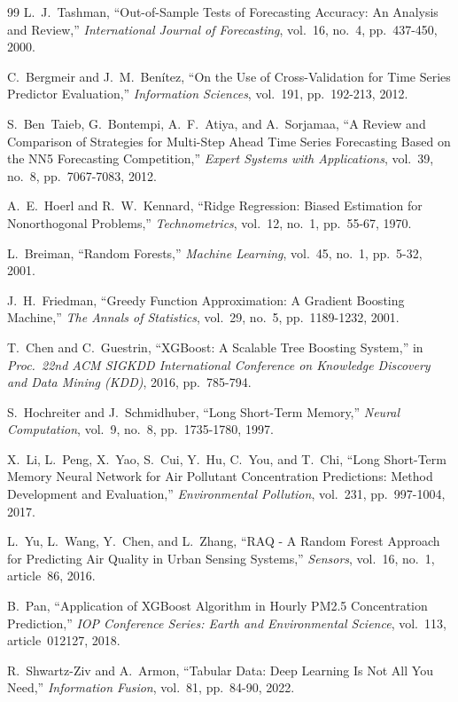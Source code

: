\begin{thebibliography}{99}
 L.~J.~Tashman, ``Out-of-Sample Tests of Forecasting
Accuracy: An Analysis and Review,'' \emph{International Journal of Forecasting},
vol.~16, no.~4, pp.~437-450, 2000.

 C.~Bergmeir and J.~M.~Benítez, ``On the Use of
Cross-Validation for Time Series Predictor Evaluation,'' \emph{Information
Sciences}, vol.~191, pp.~192-213, 2012.

 S.~Ben~Taieb, G.~Bontempi, A.~F.~Atiya, and A.~Sorjamaa,
``A Review and Comparison of Strategies for Multi-Step Ahead Time Series
Forecasting Based on the NN5 Forecasting Competition,'' \emph{Expert Systems with
Applications}, vol.~39, no.~8, pp.~7067-7083, 2012.

 A.~E.~Hoerl and R.~W.~Kennard, ``Ridge Regression: Biased
Estimation for Nonorthogonal Problems,'' \emph{Technometrics}, vol.~12, no.~1,
pp.~55-67, 1970.

 L.~Breiman, ``Random Forests,'' \emph{Machine Learning},
vol.~45, no.~1, pp.~5-32, 2001.

 J.~H.~Friedman, ``Greedy Function Approximation: A Gradient
Boosting Machine,'' \emph{The Annals of Statistics}, vol.~29, no.~5,
pp.~1189-1232, 2001.

 T.~Chen and C.~Guestrin, ``XGBoost: A Scalable Tree
Boosting System,'' in \emph{Proc.\ 22nd ACM SIGKDD International Conference on
Knowledge Discovery and Data Mining (KDD)}, 2016, pp.~785-794.

 S.~Hochreiter and J.~Schmidhuber, ``Long Short-Term Memory,''
\emph{Neural Computation}, vol.~9, no.~8, pp.~1735-1780, 1997.

 X.~Li, L.~Peng, X.~Yao, S.~Cui, Y.~Hu, C.~You, and T.~Chi,
``Long Short-Term Memory Neural Network for Air Pollutant Concentration
Predictions: Method Development and Evaluation,'' \emph{Environmental Pollution},
vol.~231, pp.~997-1004, 2017.

 L.~Yu, L.~Wang, Y.~Chen, and L.~Zhang, ``RAQ - A Random
Forest Approach for Predicting Air Quality in Urban Sensing Systems,''
\emph{Sensors}, vol.~16, no.~1, article~86, 2016.

 B.~Pan, ``Application of XGBoost Algorithm in Hourly PM2.5
Concentration Prediction,'' \emph{IOP Conference Series: Earth and Environmental
Science}, vol.~113, article~012127, 2018.

 R.~Shwartz-Ziv and A.~Armon, ``Tabular Data: Deep
Learning Is Not All You Need,'' \emph{Information Fusion}, vol.~81, pp.~84-90,
2022.


\end{thebibliography}
